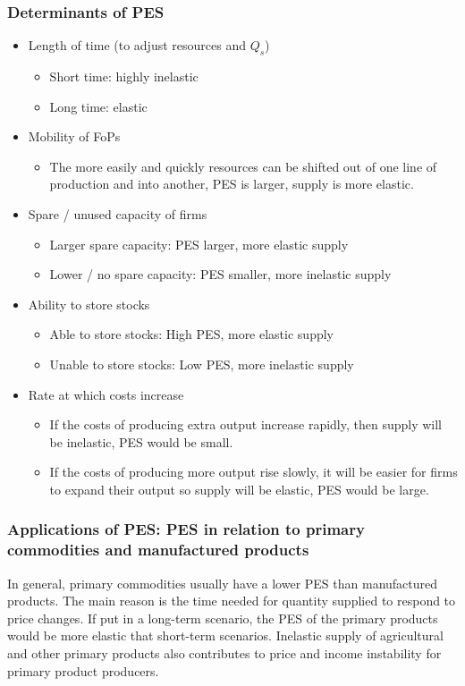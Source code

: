 \documentclass[a4paper,12pt]{article}
\begin{document}
\subsubsection*{Determinants of PES}
\begin{itemize}
  \item Length of time (to adjust resources and $Q_s$)
  \begin{itemize}
    \item Short time: highly inelastic
    \item Long time: elastic
  \end{itemize}
  \item Mobility of FoPs
  \begin{itemize}
    \item The more easily and quickly resources can be shifted out of one line of production and into another, PES is larger, supply is more elastic.
  \end{itemize}
  \item Spare / unused capacity of firms
  \begin{itemize}
    \item Larger spare capacity: PES larger, more elastic supply
    \item Lower / no spare capacity: PES smaller, more inelastic supply
  \end{itemize}
  \item Ability to store stocks
  \begin{itemize}
    \item Able to store stocks: High PES, more elastic supply
    \item Unable to store stocks: Low PES, more inelastic supply
  \end{itemize}
  \item Rate at which costs increase
  \begin{itemize}
    \item If the costs of producing extra output increase rapidly, then supply will be inelastic, PES would be small.
    \item If the costs of producing more output rise slowly, it will be easier for firms to expand their output so supply will be elastic, PES would be large.
  \end{itemize}
\end{itemize}
\subsubsection*{Applications of PES: PES in relation to primary commodities and manufactured products}
In general, primary commodities usually have a lower PES than manufactured products. The main reason
is the time needed for quantity supplied to respond to price changes. If put in a long-term scenario, the PES of the primary products would be more elastic that short-term scenarios. Inelastic supply of agricultural and other primary products also contributes to price and income instability for
primary product producers.
\end{document}
